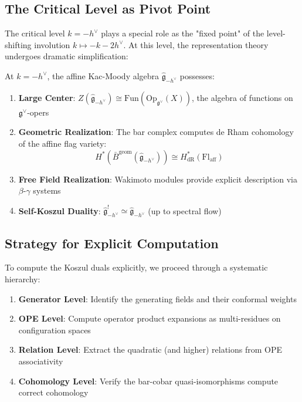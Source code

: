 \subsection{The Critical Level as Pivot Point}

The critical level $k = -h^\vee$ plays a special role as the "fixed point" of the level-shifting involution $k \mapsto -k-2h^\vee$. At this level, the representation theory undergoes dramatic simplification:

\begin{theorem}\label{thm:critical-level-structure}
At $k = -h^\vee$, the affine Kac-Moody algebra $\widehat{\mathfrak{g}}_{-h^\vee}$ possesses:
\begin{enumerate}
\item \textbf{Large Center}: $Z(\widehat{\mathfrak{g}}_{-h^\vee}) \cong \mathrm{Fun}(\mathrm{Op}_{\mathfrak{g}^\vee}(X))$, the algebra of functions on $\mathfrak{g}^\vee$-opers
\item \textbf{Geometric Realization}: The bar complex computes de Rham cohomology of the affine flag variety:
\begin{equation}
H^*(\bar{B}^{\mathrm{geom}}(\widehat{\mathfrak{g}}_{-h^\vee})) \cong H^*_{\mathrm{dR}}(\mathrm{Fl}_{\mathrm{aff}})
\end{equation}
\item \textbf{Free Field Realization}: Wakimoto modules provide explicit description via $\beta$-$\gamma$ systems
\item \textbf{Self-Koszul Duality}: $\widehat{\mathfrak{g}}_{-h^\vee}^! \simeq \widehat{\mathfrak{g}}_{-h^\vee}$ (up to spectral flow)
\end{enumerate}
\end{theorem}

\subsection{Strategy for Explicit Computation}

To compute the Koszul duals explicitly, we proceed through a systematic hierarchy:

\begin{strategy}
\begin{enumerate}
\item \textbf{Generator Level}: Identify the generating fields and their conformal weights
\item \textbf{OPE Level}: Compute operator product expansions as multi-residues on configuration spaces
\item \textbf{Relation Level}: Extract the quadratic (and higher) relations from OPE associativity
\item \textbf{Cohomology Level}: Verify the bar-cobar quasi-isomorphisms compute correct cohomology
\end{enumerate}
\end{strategy}


